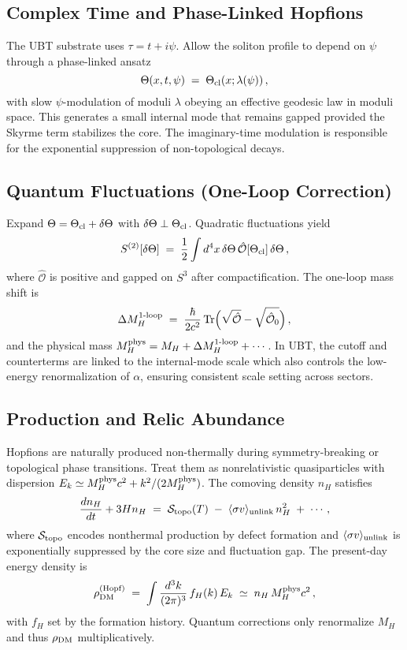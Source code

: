 \documentclass[12pt,a4paper]{article}
\numberwithin{equation}{section}
\theoremstyle{definition}
\theoremstyle{remark}
\begin{document}
\subsection{Complex Time and Phase-Linked Hopfions}
The UBT substrate uses $\tau=t+i\psi$. Allow the soliton profile to depend on $\psi$ through a phase-linked ansatz
\begin{equation}
\Theta(x,t,\psi) \;=\; \Theta_{\rm cl}(x;\lambda(\psi))\,,
\end{equation}
with slow $\psi$-modulation of moduli $\lambda$ obeying an effective geodesic law in moduli space.
This generates a small internal mode that remains gapped provided the Skyrme term stabilizes the core.
The imaginary-time modulation is responsible for the exponential suppression of non-topological decays.

\subsection{Quantum Fluctuations (One-Loop Correction)}
Expand $\Theta=\Theta_{\rm cl}+\delta\Theta$ with $\delta\Theta\perp \Theta_{\rm cl}$. Quadratic fluctuations yield
\begin{equation}
S^{(2)}[\delta\Theta] \;=\; \frac{1}{2}\int d^4x\, \delta\Theta\,\hat{\mathcal{O}}[\Theta_{\rm cl}]\,\delta\Theta\,,
\end{equation}
where $\hat{\mathcal{O}}$ is positive and gapped on $S^3$ after compactification.
The one-loop mass shift is
\begin{equation}
\Delta M_{H}^{\rm 1\text{-}loop} \;=\; \frac{\hbar}{2c^2}\,\mathrm{Tr}\Big(\sqrt{\hat{\mathcal{O}}}-\sqrt{\hat{\mathcal{O}}_0}\Big)\,,
\end{equation}
and the physical mass $M_H^{\rm phys}=M_H+\Delta M_H^{\rm 1\text{-}loop}+\cdots$.
In UBT, the cutoff and counterterms are linked to the internal-mode scale which also controls the low-energy renormalization of $\alpha$,
ensuring consistent scale setting across sectors.

\subsection{Production and Relic Abundance}
Hopfions are naturally produced non-thermally during symmetry-breaking or topological phase transitions.
Treat them as nonrelativistic quasiparticles with dispersion $E_k\simeq M_H^{\rm phys}c^2 + k^2/(2M_H^{\rm phys})$.
The comoving density $n_H$ satisfies
\begin{equation}
\frac{dn_H}{dt}+3H n_H \;=\; \mathcal{S}_{\rm topo}(T)\;-\;\langle\sigma v\rangle_{\rm unlink}\, n_H^2 \;+\; \cdots,
\end{equation}
where $\mathcal{S}_{\rm topo}$ encodes nonthermal production by defect formation and $\langle\sigma v\rangle_{\rm unlink}$ is exponentially suppressed by the core size and fluctuation gap.
The present-day energy density is
\begin{equation}
\rho_{\rm DM}^{\rm (Hopf)} \;=\; \int \frac{d^3k}{(2\pi)^3}\, f_H(k)\, E_k
\;\simeq\; n_H\, M_H^{\rm phys}c^2\,,
\end{equation}
with $f_H$ set by the formation history. Quantum corrections only renormalize $M_H$ and thus $\rho_{\rm DM}$ multiplicatively.
\end{document}
